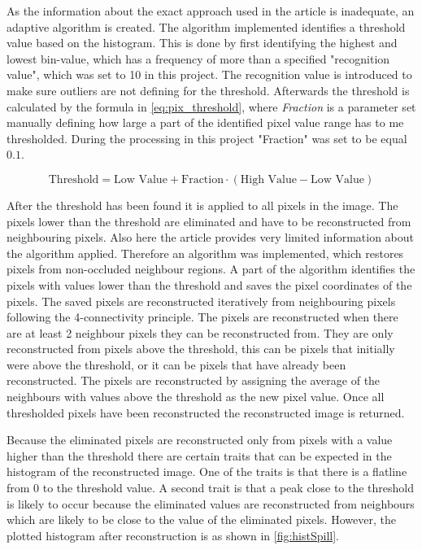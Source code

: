 As the information about the exact approach used in the article is inadequate, an adaptive algorithm is created. The algorithm implemented identifies a threshold value based on the histogram. This is done by first identifying the highest and lowest bin-value, which has a frequency of more than a specified "recognition value", which was set to 10 in this project. The recognition value is introduced to make sure outliers are not defining for the threshold. Afterwards the threshold is calculated by the formula in \autoref{eq:pix_threshold}, where \textit{Fraction} is a parameter set manually defining how large a part of the identified pixel value range has to me thresholded. During the processing in this project "Fraction" was set to be equal $0.1$. 

\begin{equation}\label{eq:pix_threshold}
	\text{Threshold}=\text{Low~Value}+\text{Fraction}\cdot(\text{High~Value}-\text{Low~Value})
\end{equation}


After the threshold has been found it is applied to all pixels in the image. The pixels lower than the threshold are eliminated and have to be reconstructed from neighbouring pixels. Also here the article provides very limited information about the algorithm applied. Therefore an algorithm was implemented, which restores pixels from non-occluded neighbour regions. A part of the algorithm identifies the pixels with values lower than the threshold and saves the pixel coordinates of the pixels. The saved pixels are  reconstructed iteratively from neighbouring pixels following the 4-connectivity principle. The pixels are reconstructed when there are at least 2 neighbour pixels they can be reconstructed from. They are only reconstructed from pixels above the threshold, this can be pixels that initially were above the threshold, or it can be pixels that have already been reconstructed. The pixels are reconstructed by assigning the average of the neighbours with values above the threshold as the new pixel value. Once all thresholded pixels have been reconstructed the reconstructed image is returned.

Because the eliminated pixels are reconstructed only from pixels with a value higher than the threshold there are certain traits that can be expected in the histogram of the reconstructed image. One of the traits is that there is a flatline from 0 to the threshold value. A second trait is that a peak close to the threshold is likely to occur because the eliminated values are reconstructed from neighbours which are likely to be close to the value of the eliminated pixels. However, the plotted histogram after reconstruction is as shown in \autoref{fig:histSpill}.

